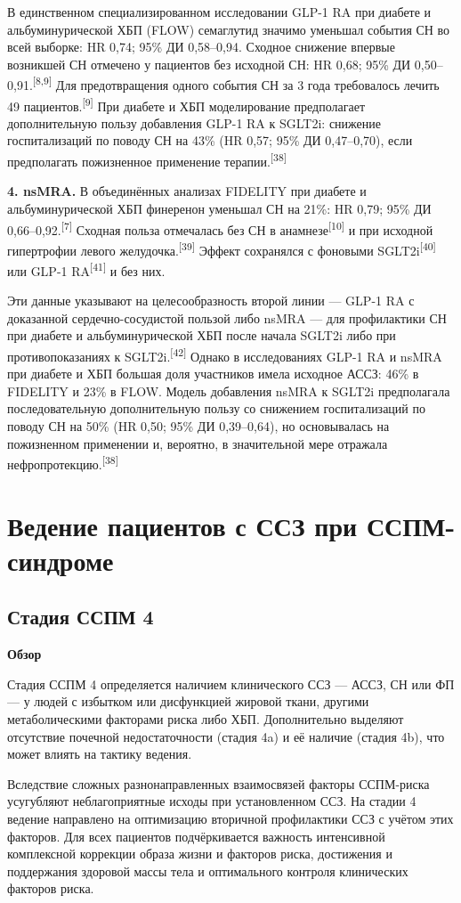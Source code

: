 \documentclass[11pt,a4paper]{article}
\newcommand{\src}[1]{\textsuperscript{[#1]}}
\newcommand{\heading}[1]{\par\medskip\textbf{#1}\par}
\begin{document}
В единственном специализированном исследовании GLP-1 RA при диабете и альбуминурической ХБП (FLOW) семаглутид значимо уменьшал события СН во всей выборке: HR 0,74; 95\% ДИ 0,58--0,94. Сходное снижение впервые возникшей СН отмечено у пациентов без исходной СН: HR 0,68; 95\% ДИ 0,50--0,91.\src{8,9} Для предотвращения одного события СН за 3 года требовалось лечить 49 пациентов.\src{9} При диабете и ХБП моделирование предполагает дополнительную пользу добавления GLP-1 RA к SGLT2i: снижение госпитализаций по поводу СН на 43\% (HR 0,57; 95\% ДИ 0,47--0,70), если предполагать пожизненное применение терапии.\src{38}

\textbf{4. nsMRA.} В объединённых анализах FIDELITY при диабете и альбуминурической ХБП финеренон уменьшал СН на 21\%: HR 0,79; 95\% ДИ 0,66--0,92.\src{7} Сходная польза отмечалась без СН в анамнезе\src{10} и при исходной гипертрофии левого желудочка.\src{39} Эффект сохранялся с фоновыми SGLT2i\src{40} или GLP-1 RA\src{41} и без них.

Эти данные указывают на целесообразность второй линии --- GLP-1 RA с доказанной сердечно-сосудистой пользой либо nsMRA --- для профилактики СН при диабете и альбуминурической ХБП после начала SGLT2i либо при противопоказаниях к SGLT2i.\src{42} Однако в исследованиях GLP-1 RA и nsMRA при диабете и ХБП большая доля участников имела исходное АССЗ: 46\% в FIDELITY и 23\% в FLOW. Модель добавления nsMRA к SGLT2i предполагала последовательную дополнительную пользу со снижением госпитализаций по поводу СН на 50\% (HR 0,50; 95\% ДИ 0,39--0,64), но основывалась на пожизненном применении и, вероятно, в значительной мере отражала нефропротекцию.\src{38}

\section{Ведение пациентов с ССЗ при ССПМ-синдроме}
\subsection{Стадия ССПМ 4}
\heading{Обзор}
Стадия ССПМ 4 определяется наличием клинического ССЗ --- АССЗ, СН или ФП --- у людей с избытком или дисфункцией жировой ткани, другими метаболическими факторами риска либо ХБП. Дополнительно выделяют отсутствие почечной недостаточности (стадия 4a) и её наличие (стадия 4b), что может влиять на тактику ведения.

Вследствие сложных разнонаправленных взаимосвязей факторы ССПМ-риска усугубляют неблагоприятные исходы при установленном ССЗ. На стадии 4 ведение направлено на оптимизацию вторичной профилактики ССЗ с учётом этих факторов. Для всех пациентов подчёркивается важность интенсивной комплексной коррекции образа жизни и факторов риска, достижения и поддержания здоровой массы тела и оптимального контроля клинических факторов риска.
\end{document}
